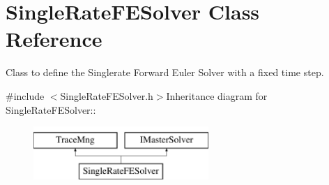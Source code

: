 \hypertarget{classSingleRateFESolver}{
\section{SingleRateFESolver Class Reference}
\label{classSingleRateFESolver}
}


Class to define the Singlerate Forward Euler Solver with a fixed time step.  


{\ttfamily \#include $<$SingleRateFESolver.h$>$}Inheritance diagram for SingleRateFESolver::\begin{figure}[H]
\begin{center}
\leavevmode
\includegraphics[height=2cm]{classSingleRateFESolver}
\end{center}
\end{figure}
